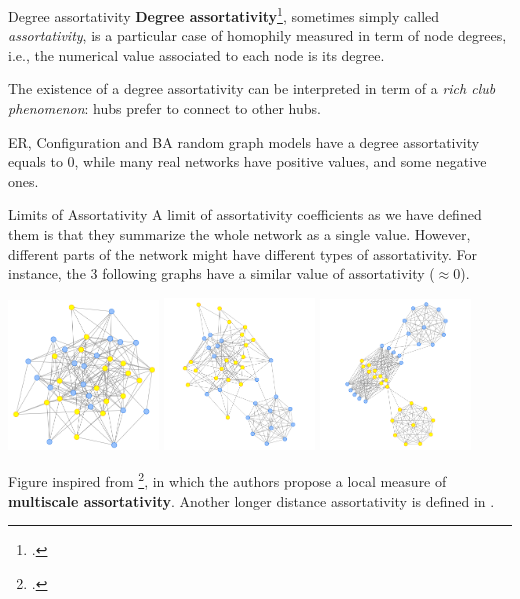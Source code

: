 \documentclass[a4paper,11pt]{book}
\begin{document}
\begin{textbox}{Degree assortativity}
\textbf{Degree assortativity}\footcite{newman2003mixing}, sometimes simply called \textit{assortativity}, is a particular case of homophily measured  in term of node degrees, i.e., the numerical value associated to each node is its degree.

The existence of a degree assortativity can be interpreted in term of a \textit{rich club phenomenon}: hubs prefer to connect to other hubs.

ER, Configuration and BA random graph models have a degree assortativity equals to 0, while many real networks have positive values, and some negative ones.

\end{textbox}




\begin{textbox}{Limits of Assortativity}
A limit of assortativity coefficients as we have defined them is that they summarize the whole network as a single value. However, different parts of the network might have different types of assortativity. For instance, the 3 following graphs have a similar value of assortativity ($\approx 0$).

\centering

\includegraphics[width=0.30\textwidth]{pics/asso1.png}
\includegraphics[width=0.30\textwidth]{pics/asso2.png}
\includegraphics[width=0.30\textwidth]{pics/asso3.png}


Figure inspired from \footcite{peel2018multiscale}, in which the authors propose a local measure of \textbf{multiscale assortativity}. Another longer distance assortativity is defined in .
\end{textbox}
\end{document}
